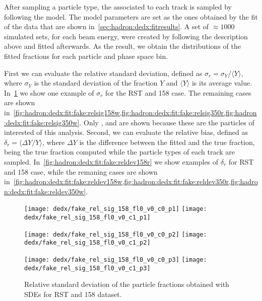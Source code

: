 After sampling a particle type, the \dedx associated to each
track is sampled by following the \dedx model.
The model parameters are set as the ones obtained by the \dedx fit
of the data that are shown in~\cref{sec:hadron:dedx:fitresults}.
A set of $\approx 1000$ simulated sets, for each beam energy,
were created by following the description above and
fitted afterwards. As the result, we obtain the distributions
of the fitted fractions for each particle and phase space bin.

First we can evaluate the relative standard deviation,
defined as $\sigma_r = \sigma_Y/\langle Y\rangle$, where
$\sigma_Y$ is the standard deviation of the fraction $Y$
and $\langle Y \rangle$ is its average value.
In~\cref{fig:hadron:dedx:fit:fake:relsig158r} we show
one example of $\sigma_r$ for the RST and 158 \GeVc case.
The remaining cases are shown
in~\cref{fig:hadron:dedx:fit:fake:relsig158w,fig:hadron:dedx:fit:fake:relsig350r,fig:hadron:dedx:fit:fake:relsig350w}. Only \pions, \kaons and \protons are shown
because these are the particles of interested of this analysis.
Second, we can evaluate the relative bias, defined as
$\delta_r = \langle \Delta Y/ Y \rangle$, where $\Delta Y$
is the difference between the fitted and the true fraction,
being the true fraction computed while the particle types
of each track are sampled.
In~\cref{fig:hadron:dedx:fit:fake:reldev158r} we show examples
of $\delta_r$ for RST and 158 \GeVc case, while the remaning
cases are shown
in~\cref{fig:hadron:dedx:fit:fake:reldev158w,fig:hadron:dedx:fit:fake:reldev350r,fig:hadron:dedx:fit:fake:reldev350w}.

\begin{figure}[!ht]
  \centering
  \texttt{[image: dedx/fake\_rel\_sig\_158\_fl0\_v0\_c0\_p1]}
  \texttt{[image: dedx/fake\_rel\_sig\_158\_fl0\_v0\_c1\_p1]}

  \texttt{[image: dedx/fake\_rel\_sig\_158\_fl0\_v0\_c0\_p2]}
  \texttt{[image: dedx/fake\_rel\_sig\_158\_fl0\_v0\_c1\_p2]}

  \texttt{[image: dedx/fake\_rel\_sig\_158\_fl0\_v0\_c0\_p3]}
  \texttt{[image: dedx/fake\_rel\_sig\_158\_fl0\_v0\_c1\_p3]}


  \caption{Relative standard deviation of the particle fractions obtained with SDEs for RST and 158 \GeVc dataset.}
  \label{fig:hadron:dedx:fit:fake:relsig158r}
\end{figure}



